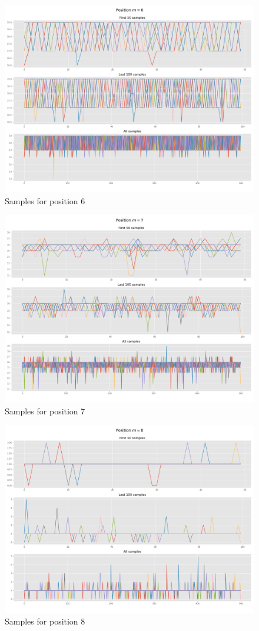 \documentclass[]{article}
\begin{document}
	\begin{figure}[H]
		\begin{center}
			
			\includegraphics[width=.5\textwidth]{task4/figures/T_2_4/Q2/convergence_pos6.png}
			\caption*{Samples for position 6}
		\end{center}
	\end{figure}
	
	\begin{figure}[H]
		\begin{center}
			
			\includegraphics[width=.5\textwidth]{task4/figures/T_2_4/Q2/convergence_pos7.png}
			\caption*{Samples for position 7}
		\end{center}
	\end{figure}
	
	\begin{figure}[H]
		\begin{center}
			
			\includegraphics[width=.5\textwidth]{task4/figures/T_2_4/Q2/convergence_pos8.png}
			\caption*{Samples for position 8}
		\end{center}
	\end{figure}
	
\end{document}
